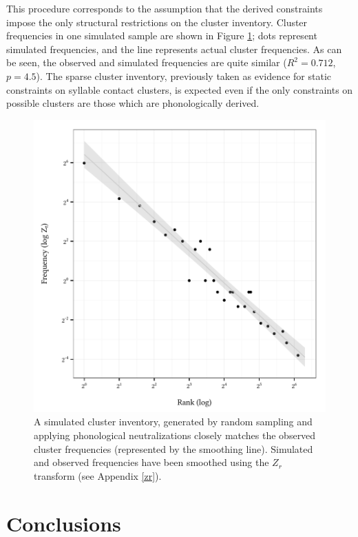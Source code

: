 This procedure corresponds to the assumption that the derived constraints impose the only structural restrictions on the cluster inventory.
Cluster frequencies in one simulated sample are shown in Figure \ref{sim}; dots represent simulated frequencies, and the line represents actual cluster frequencies.
As can be seen, the observed and simulated frequencies are quite similar 
($R^2 = 0.712$, $p = 4.5$).
The sparse cluster inventory, previously taken as evidence for static constraints on syllable contact clusters, is expected even if the only constraints on possible clusters are those which are phonologically derived.

\begin{figure}
\centering
\includegraphics{sim.pdf}
\caption{A simulated cluster inventory, generated by random sampling and applying phonological neutralizations closely matches the observed cluster frequencies (represented by the smoothing line). Simulated and observed frequencies have been smoothed using the $Z_r$ transform (see Appendix \ref{zr}).}
\label{sim}
\end{figure}

\section{Conclusions}

